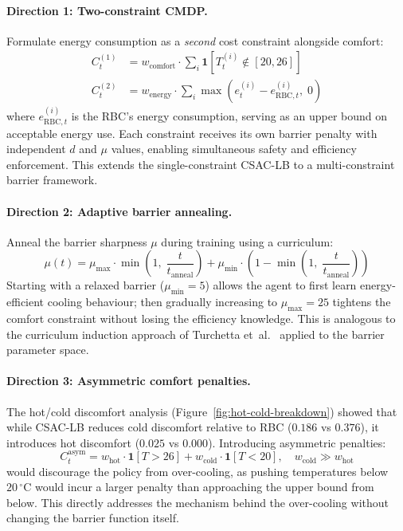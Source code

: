 \paragraph{Direction 1: Two-constraint CMDP.}
Formulate energy consumption as a \emph{second} cost constraint alongside
comfort:
\begin{align}
  C_t^{(1)} &= w_{\text{comfort}} \cdot \sum_{i} \mathbf{1}[T_t^{(i)} \notin [20, 26]] \label{eq:cost-comfort} \\
  C_t^{(2)} &= w_{\text{energy}} \cdot \sum_{i} \max\!\left(e_t^{(i)} - e_{\text{RBC},t}^{(i)},\; 0\right) \label{eq:cost-energy}
\end{align}
where $e_{\text{RBC},t}^{(i)}$ is the RBC's energy consumption, serving as
an upper bound on acceptable energy use.  Each constraint receives its own
barrier penalty with independent $d$ and $\mu$ values, enabling simultaneous
safety and efficiency enforcement.  This extends the single-constraint
CSAC-LB to a multi-constraint barrier framework.

\paragraph{Direction 2: Adaptive barrier annealing.}
Anneal the barrier sharpness $\mu$ during training using a curriculum:
\begin{equation}
  \mu(t) = \mu_{\max} \cdot \min\!\left(1,\; \frac{t}{t_{\text{anneal}}}\right)
  + \mu_{\min} \cdot \left(1 - \min\!\left(1,\; \frac{t}{t_{\text{anneal}}}\right)\right)
  \label{eq:barrier-anneal}
\end{equation}
Starting with a relaxed barrier ($\mu_{\min} = 5$) allows the agent to first
learn energy-efficient cooling behaviour; then gradually increasing to
$\mu_{\max} = 25$ tightens the comfort constraint without losing the
efficiency knowledge.  This is analogous to the curriculum induction approach
of Turchetta et~al.~\cite{turchetta2020safe} applied to the barrier
parameter space.

\paragraph{Direction 3: Asymmetric comfort penalties.}
The hot/cold discomfort analysis (Figure~\ref{fig:hot-cold-breakdown})
showed that while CSAC-LB reduces cold discomfort relative to RBC ($0.186$
vs $0.376$), it introduces hot discomfort ($0.025$ vs $0.000$).  Introducing
asymmetric penalties:
\begin{equation}
  C_t^{\text{asym}} = w_{\text{hot}} \cdot \mathbf{1}[T > 26] +
    w_{\text{cold}} \cdot \mathbf{1}[T < 20], \quad
    w_{\text{cold}} \gg w_{\text{hot}}
  \label{eq:asym-cost}
\end{equation}
would discourage the policy from over-cooling, as pushing temperatures below
$20\,^\circ$C would incur a larger penalty than approaching the upper bound
from below.  This directly addresses the mechanism behind the over-cooling
without changing the barrier function itself.

